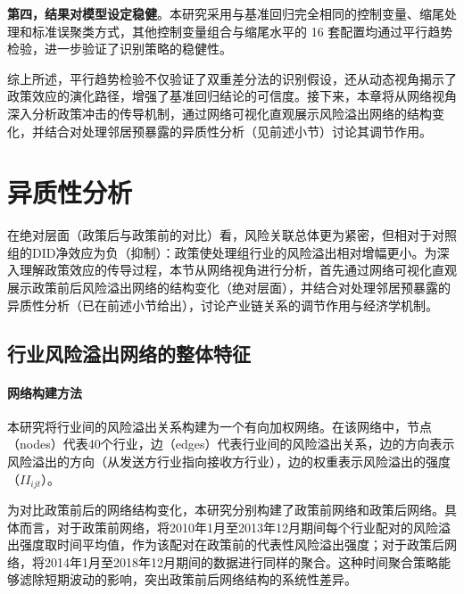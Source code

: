 \textbf{第四，结果对模型设定稳健}。本研究采用与基准回归完全相同的控制变量、缩尾处理和标准误聚类方式，其他控制变量组合与缩尾水平的 16 套配置均通过平行趋势检验，进一步验证了识别策略的稳健性。

综上所述，平行趋势检验不仅验证了双重差分法的识别假设，还从动态视角揭示了政策效应的演化路径，增强了基准回归结论的可信度。接下来，本章将从网络视角深入分析政策冲击的传导机制，通过网络可视化直观展示风险溢出网络的结构变化，并结合对处理邻居预暴露的异质性分析（见前述小节）讨论其调节作用。



\section{异质性分析}
\label{sec:network_analysis}



在绝对层面（政策后与政策前的对比）看，风险关联总体更为紧密，但相对于对照组的DID净效应为负（抑制）：政策使处理组行业的风险溢出相对增幅更小。为深入理解政策效应的传导过程，本节从网络视角进行分析，首先通过网络可视化直观展示政策前后风险溢出网络的结构变化（绝对层面），并结合对处理邻居预暴露的异质性分析（已在前述小节给出），讨论产业链关系的调节作用与经济学机制。

\subsection{行业风险溢出网络的整体特征}

\paragraph{网络构建方法}

本研究将行业间的风险溢出关系构建为一个有向加权网络。在该网络中，节点（nodes）代表40个行业，边（edges）代表行业间的风险溢出关系，边的方向表示风险溢出的方向（从发送方行业指向接收方行业），边的权重表示风险溢出的强度（$II_{ijt}$）。

为对比政策前后的网络结构变化，本研究分别构建了政策前网络和政策后网络。具体而言，对于政策前网络，将2010年1月至2013年12月期间每个行业配对的风险溢出强度取时间平均值，作为该配对在政策前的代表性风险溢出强度；对于政策后网络，将2014年1月至2018年12月期间的数据进行同样的聚合。这种时间聚合策略能够滤除短期波动的影响，突出政策前后网络结构的系统性差异\citep{acemoglu2012network,Yang2023TailRiskIO}。

